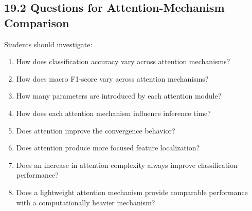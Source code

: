 \documentclass[10pt]{article}
\begin{document}
\begin{center}

\end{center}

\subsection*{19.2 Questions for Attention-Mechanism Comparison}

Students should investigate:

\begin{enumerate}

\item How does classification accuracy vary across attention mechanisms?

\item How does macro F1-score vary across attention mechanisms?

\item How many parameters are introduced by each attention module?

\item How does each attention mechanism influence inference time?

\item Does attention improve the convergence behavior?

\item Does attention produce more focused feature localization?

\item Does an increase in attention complexity always improve classification
performance?

\item Does a lightweight attention mechanism provide comparable performance
with a computationally heavier mechanism?

\end{enumerate}
\end{document}
